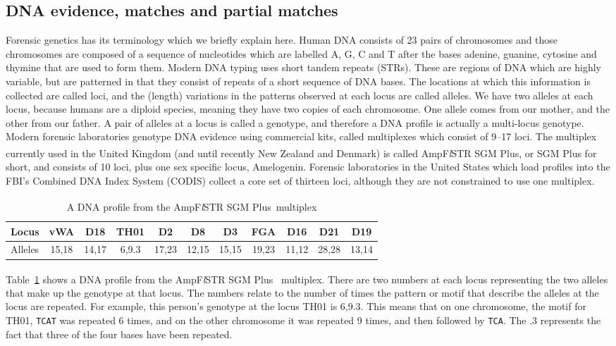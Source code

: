 \documentclass[a4paper,11pt]{article}
\newcommand{\SGMplus}{AmpF\textit{l}STR\textsuperscript{\textregistered}
  SGM Plus\textsuperscript{\texttrademark}}
\begin{document}
\subsection[Matches and partial matches]{DNA evidence, matches and partial matches}
\label{sec:dna-matches-partial}
Forensic genetics has its terminology which we briefly explain here. 
Human DNA consists of 23 pairs of chromosomes and those
chromosomes are composed of a sequence of nucleotides which are
labelled A, G, C and T after the bases adenine, guanine, cytosine and
thymine that are used to form them. Modern DNA typing uses short
tandem repeats (STRs). These are regions of DNA which are highly
variable, but are patterned in that they consist of repeats of a short
sequence of DNA bases. The locations at which this information is
collected are called loci, and the (length) variations in the patterns
observed at each locus are called alleles. We have two alleles at each
locus, because humans are a diploid species, meaning they have two
copies of each chromosome. One allele comes from our mother, and the
other from our father. A pair of alleles at a locus is called a
genotype, and therefore a DNA profile is actually a multi-locus genotype.
Modern forensic laboratories genotype DNA evidence using commercial kits,
called multiplexes which consist of 9--17 loci. The multiplex currently
used in the United Kingdom (and until recently New Zealand and
Denmark) is called \SGMplus, or SGM Plus for short, and consists of 10 loci, plus one sex
specific locus, Amelogenin. Forensic laboratories in the United States
which load profiles into the FBI's Combined DNA Index System (CODIS) collect a
core set of thirteen loci, although they are not constrained to use
one multiplex.

\begin{table}[h]
  \centering
  \begin{tabular}{l*{10}{c}}
    \toprule
    Locus & vWA & D18 & TH01 & D2 & D8 & D3 & FGA & D16 & D21 & D19 \\
    \midrule
    Alleles & 15,18 & 14,17 &  6,9.3 & 17,23 & 12,15 & 15,15 & 19,23 & 11,12 & 28,28
    & 13,14\\
    \bottomrule
  \end{tabular}
  \caption{A DNA profile from the \SGMplus~multiplex}
  \label{tab:prof}
\end{table}

Table~\ref{tab:prof} shows a DNA profile from the \SGMplus~ multiplex.
There are two numbers at each locus representing the two alleles that
make up the genotype at that locus. The numbers relate to the number
of times the pattern or motif that describe the alleles at the locus
are repeated. For example, this person's genotype at the locus TH01 is
6,9.3. This means that on one chromosome, the motif for TH01,
\texttt{TCAT} was repeated 6 times, and on the other chromosome it was
repeated 9 times, and then followed by \texttt{TCA}. The .3 represents
the fact that three of the four bases have been repeated.
\end{document}
